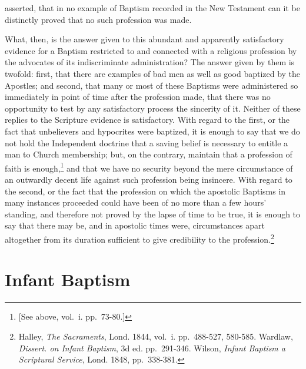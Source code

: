 \documentclass[]{book}
\begin{document}
asserted, that in no example of Baptism recorded in the New Testament can it be distinctly proved that no such profession was made.

What, then, is the answer given to this abundant and apparently satisfactory evidence for a Baptism restricted to and connected with a religious profession by the advocates of its indiscriminate administration? The answer given by them is twofold: first, that there are examples of bad men as well as good baptized by the Apostles; and second, that many or most of these Baptisms were administered so immediately in point of time after the profession made, that there was no opportunity to test by any satisfactory process the sincerity of it. Neither of these replies to the Scripture evidence is satisfactory. With regard to the first, or the fact that unbelievers and hypocrites were baptized, it is enough to say that we do not hold the Independent doctrine that a saving belief is necessary to entitle a man to Church membership; but, on the contrary, maintain that a profession of faith is enough,\footnote{{[}See above, vol.~i. pp.~73-80.{]}} and that we have no security beyond the mere circumstance of an outwardly decent life against such profession being insincere. With regard to the second, or the fact that the profession on which the apostolic Baptisms in many instances proceeded could have been of no more than a few hours' standing, and therefore not proved by the lapse of time to be true, it is enough to say that there may be, and in apostolic times were, circumstances apart altogether from its duration sufficient to give credibility to the profession.\footnote{Halley, \emph{The Sacraments}, Lond. 1844, vol.~i. pp.~488-527, 580-585. Wardlaw, \emph{Dissert. on Infant Baptism}, 3d ed. pp.~291-346. Wilson, \emph{Infant Baptism a Scriptural Service}, Lond. 1848, pp.~338-381.}

\hypertarget{infant-baptism}{%
\section{Infant Baptism}\label{infant-baptism}}
\end{document}
